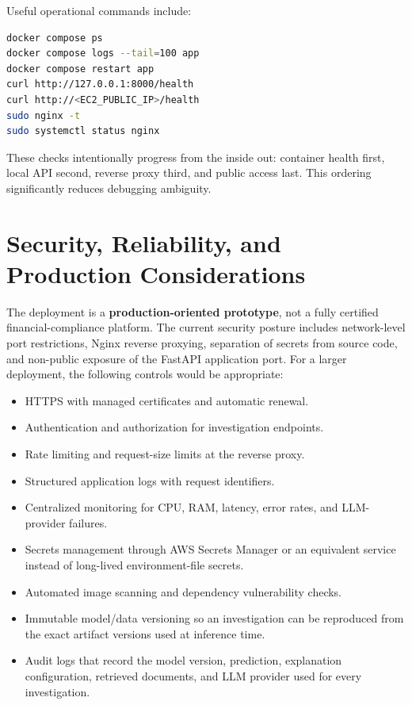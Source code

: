\documentclass[11pt,a4paper]{report}
\begin{document}
Useful operational commands include:

\begin{lstlisting}[language=bash]
docker compose ps
docker compose logs --tail=100 app
docker compose restart app
curl http://127.0.0.1:8000/health
curl http://<EC2_PUBLIC_IP>/health
sudo nginx -t
sudo systemctl status nginx
\end{lstlisting}

These checks intentionally progress from the inside out: container health first, local API second, reverse proxy third, and public access last. This ordering significantly reduces debugging ambiguity.

\section{Security, Reliability, and Production Considerations}

The deployment is a \textbf{production-oriented prototype}, not a fully certified financial-compliance platform. The current security posture includes network-level port restrictions, Nginx reverse proxying, separation of secrets from source code, and non-public exposure of the FastAPI application port. For a larger deployment, the following controls would be appropriate:

\begin{itemize}[leftmargin=1.5em]
  \item HTTPS with managed certificates and automatic renewal.
  \item Authentication and authorization for investigation endpoints.
  \item Rate limiting and request-size limits at the reverse proxy.
  \item Structured application logs with request identifiers.
  \item Centralized monitoring for CPU, RAM, latency, error rates, and LLM-provider failures.
  \item Secrets management through AWS Secrets Manager or an equivalent service instead of long-lived environment-file secrets.
  \item Automated image scanning and dependency vulnerability checks.
  \item Immutable model/data versioning so an investigation can be reproduced from the exact artifact versions used at inference time.
  \item Audit logs that record the model version, prediction, explanation configuration, retrieved documents, and LLM provider used for every investigation.
\end{itemize}
\end{document}
